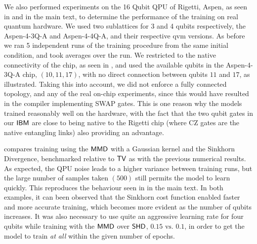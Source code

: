 We also performed experiments on the 16 Qubit QPU of Rigetti, {\selectfont Aspen}, as seen in  and  in the main text, to determine the performance of the training on real quantum hardware. We used two sublattices for 3 and 4 qubits respectively, the {\selectfont Aspen-4-3Q-A} and {\selectfont Aspen-4-4Q-A}, and their respective {\selectfont qvm} versions. As before we ran 5 independent runs of the training procedure from the same initial condition, and took averages over the run. We restricted to the native connectivity of the chip, as seen in , and used the available qubits in the {\selectfont Aspen-4-3Q-A} chip, $(10, 11, 17)$, with no direct connection between qubits $11$ and $17$, as illustrated. Taking this into account, we did not enforce a fully connected topology, and any of the real on-chip experiments, since this would have resulted in the compiler implementing SWAP gates. This is one reason why the models trained reasonably well on the hardware, with the fact that the two qubit gates in our $\textsf{IBM}$ are close to being native to the Rigetti chip (where CZ gates are the native entangling links) also providing an advantage.

 compares training using the $\operatorname{\textsf{MMD}}$ with a Gaussian kernel and the Sinkhorn Divergence, benchmarked relative to $\operatorname{\textsf{TV}}$ as with the previous numerical results. As expected, the QPU noise leads to a higher variance between training runs, but the large number of samples taken $(500)$ still permits the model to learn quickly. This reproduces the behaviour seen in  in the main text. In both examples, it can been observed that the Sinkhorn cost function enabled faster and more accurate training, which becomes more evident as the number of qubits increases. It was also necessary to use quite an aggressive learning rate for four qubits while training with the $\operatorname{\textsf{MMD}}$ over $\operatorname{\textsf{SHD}}$, $0.15 \text{ vs. } 0.1$, in order to get the model to train \textit{at all} within the given number of epochs. 


